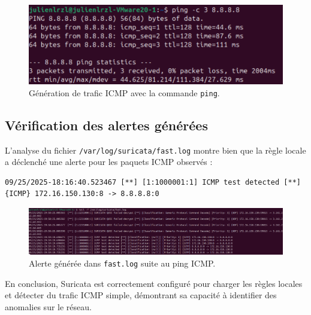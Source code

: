 \begin{figure}[H]
    \centering
    \includegraphics[width=0.9\linewidth]{assets/figures/ping-icmp.png}
    \caption{Génération de trafic ICMP avec la commande \texttt{ping}.}
\end{figure}

\subsection{Vérification des alertes générées}
L’analyse du fichier \texttt{/var/log/suricata/fast.log} montre bien que la règle locale a déclenché une alerte pour les paquets ICMP observés :

\begin{lstlisting}[style=bashstyle]
09/25/2025-18:16:40.523467 [**] [1:1000001:1] ICMP test detected [**] {ICMP} 172.16.150.130:8 -> 8.8.8.8:0
\end{lstlisting}


\begin{figure}[H]
    \centering
    \includegraphics[width=0.9\linewidth]{assets/figures/icmp-alert.png}
    \caption{Alerte générée dans \texttt{fast.log} suite au ping ICMP.}
\end{figure}

\bigskip
En conclusion, Suricata est correctement configuré pour charger les règles locales et détecter du trafic ICMP simple, démontrant sa capacité à identifier des anomalies sur le réseau.